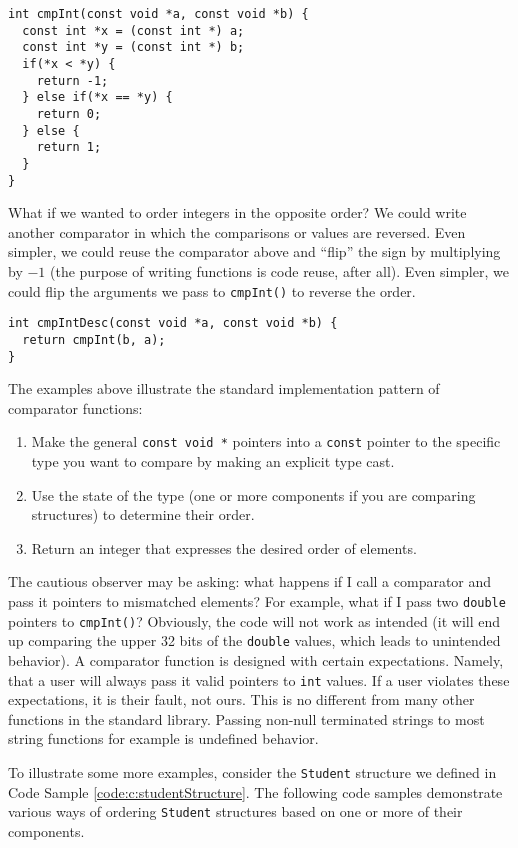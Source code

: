 \begin{verbatim}
int cmpInt(const void *a, const void *b) {
  const int *x = (const int *) a;
  const int *y = (const int *) b;
  if(*x < *y) {
    return -1;
  } else if(*x == *y) {
    return 0;
  } else {
    return 1;
  }
}
\end{verbatim}

What if we wanted to order integers in the opposite order?  We could write
another comparator in which the comparisons or values are reversed.  Even
simpler, we could reuse the comparator above and ``flip'' the sign by 
multiplying by $-1$ (the purpose of writing functions is
code reuse, after all).  Even simpler, we could flip the arguments we pass to 
\texttt{cmpInt()} to reverse the order.

\begin{verbatim}
int cmpIntDesc(const void *a, const void *b) {
  return cmpInt(b, a);
}
\end{verbatim}

The examples above illustrate the standard implementation pattern of 
comparator functions:
\begin{enumerate}
  \item Make the general \texttt{const void *} pointers into a 
    \texttt{const} pointer to the specific type you want to compare
    by making an explicit type cast.
  \item Use the state of the type (one or more components if you are comparing
  	structures) to determine their order.
  \item Return an integer that expresses the desired order of elements.
\end{enumerate}

The cautious observer may be asking: what happens if I call a comparator
and pass it pointers to mismatched elements?  For example, what if I pass
two \texttt{double} pointers to \texttt{cmpInt()}?  Obviously, the
code will not work as intended (it will end up comparing the upper 32 bits of the
\texttt{double} values, which leads to unintended behavior).  
A comparator function is 
designed with certain expectations.  Namely, that a user will always 
pass it valid pointers to \texttt{int} values.  If
a user violates these expectations, it is their fault, not ours.  This is no
different from many other functions in the standard library.  Passing non-null
terminated strings to most string functions for example is undefined behavior.

To illustrate some more examples, consider the \texttt{Student} structure
we defined in Code Sample \ref{code:c:studentStructure}.  The following code
samples demonstrate various ways of ordering \texttt{Student} structures based on one or more of their components.

